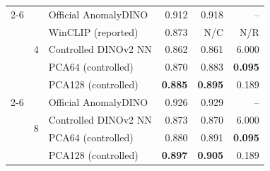 \begin{table}[pos=t]
\begin{tabular}{lllrrr}
\cmidrule(lr){2-6}
& \multirow{5}{*}{4} & Official AnomalyDINO & 0.912 & 0.918 & -- \\
& & WinCLIP (reported) & 0.873 & N/C & N/R \\
& & Controlled DINOv2 NN & 0.862 & 0.861 & 6.000 \\
& & PCA64 (controlled) & 0.870 & 0.883 & \textbf{0.095} \\
& & PCA128 (controlled) & \textbf{0.885} & \textbf{0.895} & 0.189 \\
\cmidrule(lr){2-6}
& \multirow{4}{*}{8} & Official AnomalyDINO & 0.926 & 0.929 & -- \\
& & Controlled DINOv2 NN & 0.873 & 0.870 & 6.000 \\
& & PCA64 (controlled) & 0.880 & 0.891 & \textbf{0.095} \\
& & PCA128 (controlled) & \textbf{0.897} & \textbf{0.905} & 0.189 \\
\bottomrule
\end{tabular}
\end{table}

